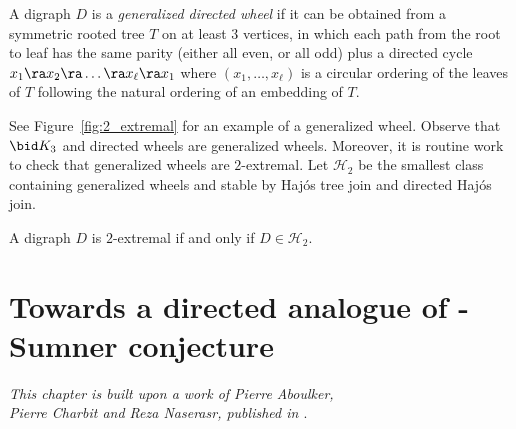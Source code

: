 \begin{definition}\label{def:HTJ2}

A digraph $D$ is a \emph{generalized directed wheel} if it can be obtained from a symmetric rooted tree $T$ on at least $3$ vertices, in which each path from the root to leaf has the same parity (either all even, or all odd) plus a directed cycle $x_1 \ra x_2 \ra \dots \ra x_{\ell} \ra x_1$ where $(x_1, \dots, x_{\ell})$ is a circular ordering of the leaves of $T$ following the natural ordering of an embedding of $T$. 
\end{definition}
See Figure~\ref{fig:2_extremal} for an example of a generalized wheel. Observe that $\bid K_3$ and directed wheels are generalized wheels. Moreover, it is routine work to check that generalized wheels are $2$-extremal.  
Let $\mathcal H_2$ be the smallest class containing generalized wheels and stable by Haj\'os tree join and directed Haj\'os join. %

\begin{conjecture}\label{conj:two_extremal}
A digraph $D$ is $2$-extremal if and only if $D \in \mathcal H_2$.
\end{conjecture}



\chapter{Towards a directed analogue of \Gya-Sumner conjecture}\label{chpt:gyarfas}

\begin{flushright}{\slshape    
This chapter is built upon a work of Pierre Aboulker, \\
Pierre Charbit and Reza Naserasr, published in \cite{ACN21}}. \\ \medskip
\end{flushright}

